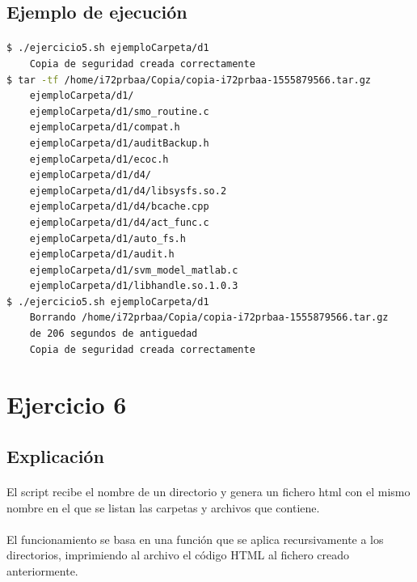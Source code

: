 \documentclass[12pt,a4paper]{article}
\begin{document}
\subsection{Ejemplo de ejecución}
\paragraph{}
\begin{lstlisting}[basicstyle=\ttfamily\small,language=bash]
$ ./ejercicio5.sh ejemploCarpeta/d1
	Copia de seguridad creada correctamente
$ tar -tf /home/i72prbaa/Copia/copia-i72prbaa-1555879566.tar.gz 
	ejemploCarpeta/d1/
	ejemploCarpeta/d1/smo_routine.c
	ejemploCarpeta/d1/compat.h
	ejemploCarpeta/d1/auditBackup.h
	ejemploCarpeta/d1/ecoc.h
	ejemploCarpeta/d1/d4/
	ejemploCarpeta/d1/d4/libsysfs.so.2
	ejemploCarpeta/d1/d4/bcache.cpp
	ejemploCarpeta/d1/d4/act_func.c
	ejemploCarpeta/d1/auto_fs.h
	ejemploCarpeta/d1/audit.h
	ejemploCarpeta/d1/svm_model_matlab.c
	ejemploCarpeta/d1/libhandle.so.1.0.3
$ ./ejercicio5.sh ejemploCarpeta/d1                  
	Borrando /home/i72prbaa/Copia/copia-i72prbaa-1555879566.tar.gz 
	de 206 segundos de antiguedad
	Copia de seguridad creada correctamente

\end{lstlisting}

\pagebreak

\section{Ejercicio 6}
\subsection{Explicación}
\paragraph{}
El script recibe el nombre de un directorio y genera un fichero html con el mismo nombre en el que se listan las carpetas y archivos que contiene.
\paragraph{}
El funcionamiento se basa en una función que se aplica recursivamente a los directorios, imprimiendo al archivo el código HTML al fichero creado anteriormente.
\end{document}
